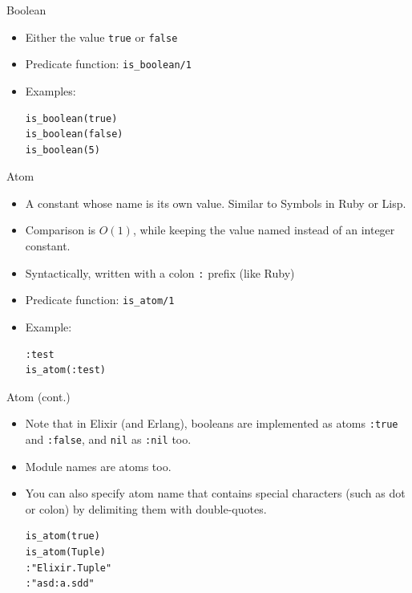 \documentclass[12pt]{beamer}
\begin{document}
\begin{frame}[fragile]{Boolean}
  \begin{itemize}
    \item Either the value \texttt{true} or \texttt{false}
    \item Predicate function: \texttt{is_boolean/1}
    \item Examples:
          \begin{verbatim}
is_boolean(true)
is_boolean(false)
is_boolean(5)
  \end{verbatim}
  \end{itemize}
\end{frame}

\begin{frame}[fragile]{Atom}
  \begin{itemize}
    \item A constant whose name is its own value. Similar to Symbols in Ruby or Lisp.
    \item Comparison is $O(1)$, while keeping the value named instead of an integer constant.
    \item Syntactically, written with a colon \texttt{:} prefix (like Ruby)
    \item Predicate function: \texttt{is_atom/1}
    \item Example:
          \begin{verbatim}
:test
is_atom(:test)
  \end{verbatim}
  \end{itemize}
\end{frame}

\begin{frame}[fragile]{Atom (cont.)}
  \begin{itemize}
    \item Note that in Elixir (and Erlang), booleans are implemented as atoms \texttt{:true} and \texttt{:false}, and \texttt{nil} as \texttt{:nil} too.
    \item Module names are atoms too.
    \item You can also specify atom name that contains special characters (such as dot or colon) by delimiting them with double-quotes.
          \begin{verbatim}
is_atom(true)
is_atom(Tuple)
:"Elixir.Tuple"
:"asd:a.sdd"
          \end{verbatim}
  \end{itemize}
\end{frame}
\end{document}
